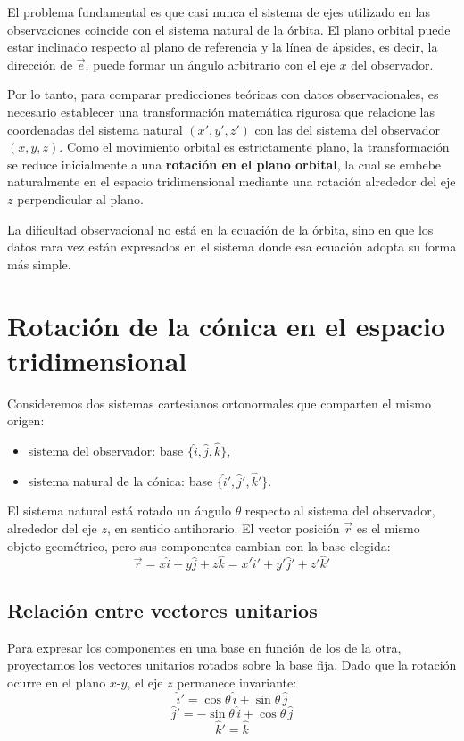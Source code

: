El problema fundamental es que casi nunca el sistema de ejes utilizado en las observaciones coincide con el sistema natural de la órbita. El plano orbital puede estar inclinado respecto al plano de referencia y la línea de ápsides, es decir, la dirección de $\vec{e}$, puede formar un ángulo arbitrario con el eje $x$ del observador.

Por lo tanto, para comparar predicciones teóricas con datos observacionales, es necesario establecer una transformación matemática rigurosa que relacione las coordenadas del sistema natural $(x',y',z')$ con las del sistema del observador $(x,y,z)$. Como el movimiento orbital es estrictamente plano, la transformación se reduce inicialmente a una \textbf{rotación en el plano orbital}, la cual se embebe naturalmente en el espacio tridimensional mediante una rotación alrededor del eje $z$ perpendicular al plano.

\begin{importante}
La dificultad observacional no está en la ecuación de la órbita, sino en que los datos rara vez están expresados en el sistema donde esa ecuación adopta su forma más simple.
\end{importante}

\section{Rotación de la cónica en el espacio tridimensional}
Consideremos dos sistemas cartesianos ortonormales que comparten el mismo origen:
\begin{itemize}
    \item sistema del observador: base $\{\hat{i}, \hat{j}, \hat{k}\}$,
    \item sistema natural de la cónica: base $\{\hat{i}', \hat{j}', \hat{k}'\}$.
\end{itemize}

El sistema natural está rotado un ángulo $\theta$ respecto al sistema del observador, alrededor del eje $z$, en sentido antihorario. El vector posición $\vec{r}$ es el mismo objeto geométrico, pero sus componentes cambian con la base elegida:
$$ \vec{r} = x\hat{i} + y\hat{j} + z\hat{k} = x'\hat{i}' + y'\hat{j}' + z'\hat{k}' $$

\subsection{Relación entre vectores unitarios}
Para expresar los componentes en una base en función de los de la otra, proyectamos los vectores unitarios rotados sobre la base fija. Dado que la rotación ocurre en el plano $x$-$y$, el eje $z$ permanece invariante:
$$ \hat{i}' = \cos\theta\,\hat{i} + \sin\theta\,\hat{j} $$
$$ \hat{j}' = -\sin\theta\,\hat{i} + \cos\theta\,\hat{j} $$
$$ \hat{k}' = \hat{k} $$

